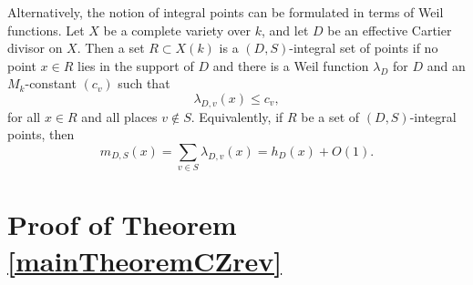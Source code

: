 \documentclass[10pt]{amsart}
\numberwithin{equation}{section}
\theoremstyle{plain}
\theoremstyle{definition}
\begin{document}
Alternatively, the notion of integral points can be formulated in terms of Weil functions. Let $X$ be a complete variety over $k$, and let $D$ be an effective Cartier divisor on $X$. Then a set $R \subset X(k)$ is a $(D,S)$-integral set of points if no point $x \in R$ lies in the support of $D$ and there is a Weil function $\lambda_D$ for $D$ and an $M_k$-constant $(c_v)$ such that
\begin{equation*}
    \lambda_{D,v}(x) \leq c_v,
\end{equation*}
for all $x \in R$ and all places $v \not \in S$. Equivalently, if $R$ be a set of $(D,S)$-integral points, then
\begin{equation*}
    m_{D,S}(x)=\sum_{v \in S}\lambda_{D,v}(x)=h_D(x) +O(1).
\end{equation*}
 


 
 \section{Proof of Theorem \ref{mainTheoremCZrev}}\label{ProofmainTheoremCZ}
 
\end{document}
